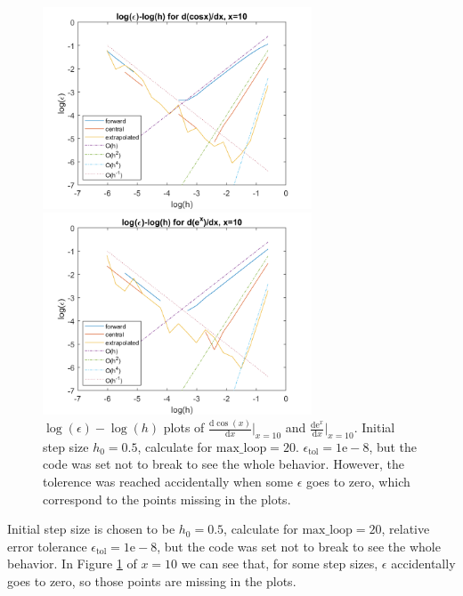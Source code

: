 \documentclass[12pt, graphicx]{article}
\begin{document}
\begin{figure}[ht]
\begin{minipage}{0.48\linewidth}
\centering
\includegraphics[width = 80mm]{dif_cos_10.png}
\end{minipage}
\begin{minipage}{0.48\linewidth}
\centering
\includegraphics[width = 80mm]{dif_exp_10.png}
\end{minipage}
\caption{$\log(\epsilon)-\log(h)$ plots of $\frac{\mathrm{d}\cos(x)}{\mathrm{d}x}|_{x=10}$ and $\frac{\mathrm{d}\mathrm{e}^x}{\mathrm{d}x}|_{x=10}$. Initial step size $h_0=0.5$, calculate for $\mathrm{max\_loop}=20$. $\epsilon_\mathrm{tol}=1\mathrm{e}-8$, but the code was set not to break to see the whole behavior. However, the tolerence was reached accidentally when some $\epsilon$ goes to zero, which correspond to the points missing in the plots.}
\label{fig:dif_10}
\end{figure}

Initial step size is chosen to be $h_0=0.5$, calculate for $\mathrm{max\_loop}=20$, relative error tolerance $\epsilon_\mathrm{tol}=1\mathrm{e}-8$, but the code was set not to break to see the whole behavior. In Figure \ref{fig:dif_10} of $x=10$ we can see that, for some step sizes, $\epsilon$ accidentally goes to zero, so those points are missing in the plots.\par
\end{document}
